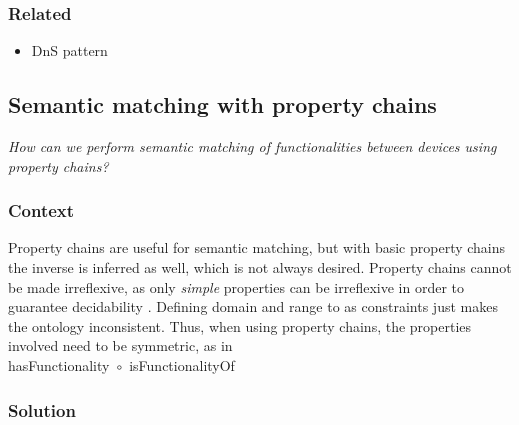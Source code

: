 \subsubsection{Related}

\begin{itemize}
	\item \ac{DnS} pattern
\end{itemize}




\subsection{Semantic matching with property chains}
\label{SemanticMatchingChains}

\emph{How can we perform semantic matching of functionalities between devices using property chains?}

\subsubsection{Context}

Property chains are useful for semantic matching, but with basic property chains the inverse is inferred as well, which is not always desired. Property chains cannot be made irreflexive, as only \emph{simple} properties can be irreflexive in order to guarantee decidability \cite{Bao2009}. Defining domain and range to as constraints just makes the ontology inconsistent. Thus, when using property chains, the properties involved need to be symmetric, as in\\ 

\noindent
hasFunctionality~\ensuremath{\circ}~isFunctionalityOf

\subsubsection{Solution}

